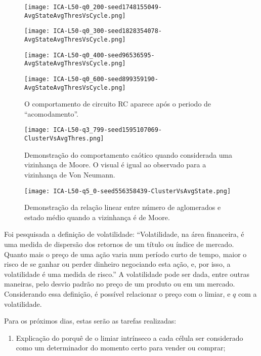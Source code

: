 \documentclass[12pt,a4paper,final]{article}
\begin{document}
  \begin{figure}[h]
    \centering
    \texttt{[image: ICA-L50-q0\_200-seed1748155049-AvgStateAvgThresVsCycle.png]}
    \caption{}
  \end{figure}
  
  \begin{figure}[h]
    \centering
    \texttt{[image: ICA-L50-q0\_300-seed1828354078-AvgStateAvgThresVsCycle.png]}
    \caption{}
  \end{figure}

  \begin{figure}[h]
    \centering
    \texttt{[image: ICA-L50-q0\_400-seed96536595-AvgStateAvgThresVsCycle.png]}
    \caption{}
  \end{figure}
  
  \begin{figure}[h]
    \centering
    \texttt{[image: ICA-L50-q0\_600-seed899359190-AvgStateAvgThresVsCycle.png]}
    \caption{O comportamento de circuito RC aparece após o periodo de ``acomodamento''.}
  \end{figure}

  \begin{figure}[h]
    \centering
    \texttt{[image: ICA-L50-q3\_799-seed1595107069-ClusterVsAvgThres.png]}
    \caption{Demonstração do comportamento caótico quando considerada uma vizinhança de Moore. O visual é igual ao observado para a vizinhança de Von Neumann.}
  \end{figure}

  \begin{figure}[h]
    \centering
    \texttt{[image: ICA-L50-q5\_0-seed556358439-ClusterVsAvgState.png]}
    \caption{Demonstração da relação linear entre número de aglomerados e estado médio quando a vizinhança é de Moore.}
  \end{figure}

  Foi pesquisada a definição de volatilidade: ``Volatilidade, na área financeira, é uma medida de dispersão dos retornos de um título ou índice de mercado. Quanto mais o preço de uma ação varia num período curto de tempo, maior o risco de se ganhar ou perder dinheiro negociando esta ação, e, por isso, a volatilidade é uma medida de risco.'' A volatilidade pode ser dada, entre outras maneiras, pelo desvio padrão no preço de um produto ou em um mercado. Considerando essa definição, é possível relacionar o preço com o limiar, e $q$ com a volatilidade.

  Para os próximos dias, estas serão as tarefas realizadas:
  \begin{enumerate}
    \item Explicação do porquê de o limiar intrínseco a cada célula ser considerado como um determinador do momento certo para vender ou comprar;
	\end{enumerate}
\end{document}
